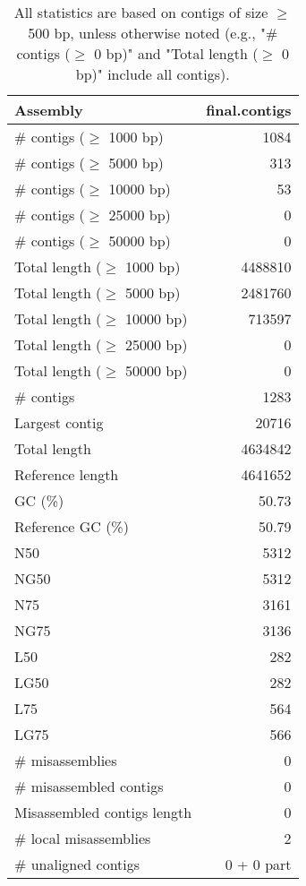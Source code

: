 \documentclass[12pt,a4paper]{article}
\begin{document}
\begin{table}[ht]
\begin{center}
\caption{All statistics are based on contigs of size $\geq$ 500 bp, unless otherwise noted (e.g., "\# contigs ($\geq$ 0 bp)" and "Total length ($\geq$ 0 bp)" include all contigs).}
\begin{tabular}{|l*{1}{|r}|}
\hline
Assembly & final.contigs \\ \hline
\# contigs ($\geq$ 1000 bp) & 1084 \\ \hline
\# contigs ($\geq$ 5000 bp) & 313 \\ \hline
\# contigs ($\geq$ 10000 bp) & 53 \\ \hline
\# contigs ($\geq$ 25000 bp) & 0 \\ \hline
\# contigs ($\geq$ 50000 bp) & 0 \\ \hline
Total length ($\geq$ 1000 bp) & 4488810 \\ \hline
Total length ($\geq$ 5000 bp) & 2481760 \\ \hline
Total length ($\geq$ 10000 bp) & 713597 \\ \hline
Total length ($\geq$ 25000 bp) & 0 \\ \hline
Total length ($\geq$ 50000 bp) & 0 \\ \hline
\# contigs & 1283 \\ \hline
Largest contig & 20716 \\ \hline
Total length & 4634842 \\ \hline
Reference length & 4641652 \\ \hline
GC (\%) & 50.73 \\ \hline
Reference GC (\%) & 50.79 \\ \hline
N50 & 5312 \\ \hline
NG50 & 5312 \\ \hline
N75 & 3161 \\ \hline
NG75 & 3136 \\ \hline
L50 & 282 \\ \hline
LG50 & 282 \\ \hline
L75 & 564 \\ \hline
LG75 & 566 \\ \hline
\# misassemblies & 0 \\ \hline
\# misassembled contigs & 0 \\ \hline
Misassembled contigs length & 0 \\ \hline
\# local misassemblies & 2 \\ \hline
\# unaligned contigs & 0 + 0 part \\ \hline

\end{tabular}
\end{center}
\end{table}
\end{document}
